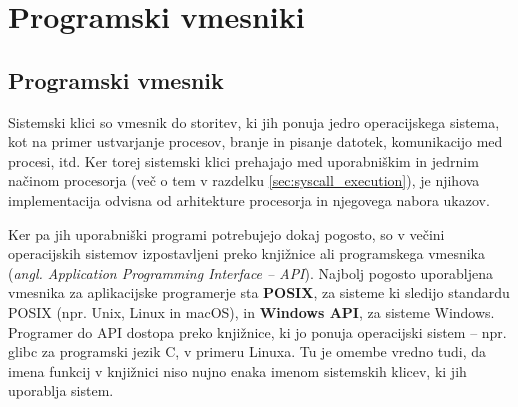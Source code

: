 \documentclass[a4paper,12pt,openright]{book}
\begin{document}
\chapter{Programski vmesniki}


\section{Programski vmesnik} \label{sec:syscalls}

Sistemski klici so vmesnik do storitev, ki jih ponuja jedro operacijskega sistema, kot na primer ustvarjanje procesov, branje in pisanje datotek, komunikacijo med procesi, itd.
Ker torej sistemski klici prehajajo med uporabniškim in jedrnim načinom procesorja (več o tem v razdelku \ref{sec:syscall_execution}), je njihova implementacija odvisna od arhitekture procesorja in njegovega nabora ukazov.

Ker pa jih uporabniški programi potrebujejo dokaj pogosto, so v večini operacijskih sistemov izpostavljeni preko knjižnice ali programskega vmesnika (\textit{angl. Application Programming Interface -- API}).
Najbolj pogosto uporabljena vmesnika za aplikacijske programerje sta \textbf{POSIX}, za sisteme ki sledijo standardu POSIX (npr. Unix, Linux in macOS), in \textbf{Windows API}, za sisteme Windows.
Programer do API dostopa preko knjižnice, ki jo ponuja operacijski sistem -- npr. glibc za programski jezik C, v primeru Linuxa.
Tu je omembe vredno tudi, da imena funkcij v knjižnici niso nujno enaka imenom sistemskih klicev, ki jih uporablja sistem.
\end{document}
